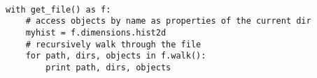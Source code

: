 \begin{footnotesize}
\begin{verbatim}

with get_file() as f:
    # access objects by name as properties of the current dir
    myhist = f.dimensions.hist2d
    # recursively walk through the file
    for path, dirs, objects in f.walk():
        print path, dirs, objects
\end{verbatim}
\end{footnotesize}
